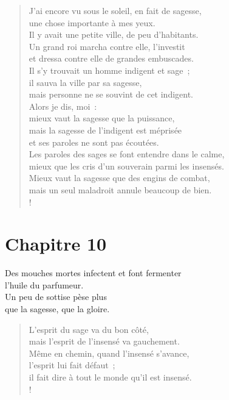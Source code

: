 \documentclass[french,twoside]{book} %
\def\mednobreak{\ifdim\lastskip<\medskipamount
  \removelastskip\nopagebreak\medskip\fi}
\newcommand{\labelblock}[1]{\medbreak{\noindent\color{rubric}\bfseries #1}\par\mednobreak}
\begin{document}
\labelblock{La sagesse méconnue}


\begin{verse}
J’ai encore vu sous le soleil, en fait de sagesse, \\
une chose importante à mes yeux.\\
Il y avait une petite ville, de peu d’habitants. \\
Un grand roi marcha contre elle, l’investit \\
et dressa contre elle de grandes embuscades.\\
Il s’y trouvait un homme indigent et sage ; \\
il sauva la ville par sa sagesse, \\
mais personne ne se souvint de cet indigent.\\
Alors je dis, moi : \\
mieux vaut la sagesse que la puissance, \\
mais la sagesse de l’indigent est méprisée \\
et ses paroles ne sont pas écoutées.\\
Les paroles des sages se font entendre dans le calme, \\
mieux que les cris d’un souverain parmi les insensés.\\
Mieux vaut la sagesse que des engins de combat, \\
mais un seul maladroit annule beaucoup de bien.\\!
\end{verse}
\section[Chapitre 10]{Chapitre 10}\renewcommand{\leftmark}{Chapitre 10}

Des mouches mortes infectent et font fermenter \\
l’huile du parfumeur. \\
Un peu de sottise pèse plus \\
que la sagesse, que la gloire.\\

\begin{verse}
L’esprit du sage va du bon côté, \\
mais l’esprit de l’insensé va gauchement.\\
Même en chemin, quand l’insensé s’avance, \\
l’esprit lui fait défaut ; \\
il fait dire à tout le monde qu’il est insensé.\\!
\end{verse}
\end{document}

